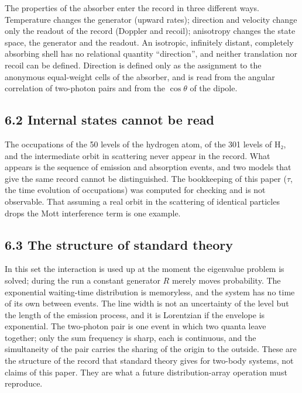 \documentclass[
  a4paper,
]{article}
\begin{document}
The properties of the absorber enter the record in three different ways.
Temperature changes the generator (upward rates); direction and velocity
change only the readout of the record (Doppler and recoil); anisotropy
changes the state space, the generator and the readout. An isotropic,
infinitely distant, completely absorbing shell has no relational
quantity ``direction'', and neither translation nor recoil can be
defined. Direction is defined only as the assignment to the anonymous
equal-weight cells of the absorber, and is read from the angular
correlation of two-photon pairs and from the \(\cos\theta\) of the
dipole.

\subsection{6.2 Internal states cannot be
read}\label{internal-states-cannot-be-read}

The occupations of the 50 levels of the hydrogen atom, of the 301 levels
of H₂, and the intermediate orbit in scattering never appear in the
record. What appears is the sequence of emission and absorption events,
and two models that give the same record cannot be distinguished. The
bookkeeping of this paper (\(\tau\), the time evolution of occupations)
was computed for checking and is not observable. That assuming a real
orbit in the scattering of identical particles drops the Mott
interference term is one example.

\subsection{6.3 The structure of standard
theory}\label{the-structure-of-standard-theory}

In this set the interaction is used up at the moment the eigenvalue
problem is solved; during the run a constant generator \(R\) merely
moves probability. The exponential waiting-time distribution is
memoryless, and the system has no time of its own between events. The
line width is not an uncertainty of the level but the length of the
emission process, and it is Lorentzian if the envelope is exponential.
The two-photon pair is one event in which two quanta leave together;
only the sum frequency is sharp, each is continuous, and the
simultaneity of the pair carries the sharing of the origin to the
outside. These are the structure of the record that standard theory
gives for two-body systems, not claims of this paper. They are what a
future distribution-array operation must reproduce.
\end{document}
